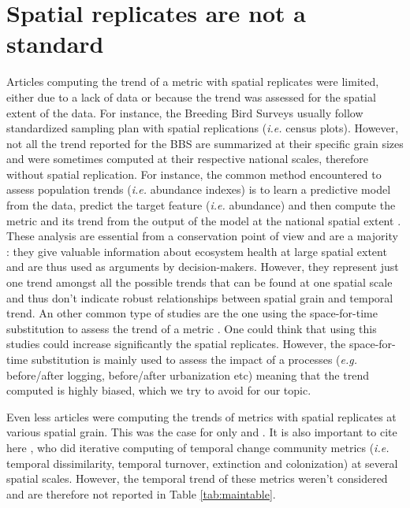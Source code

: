 \documentclass[
  12pt,
  oneside]{report}
\begin{document}
\hypertarget{spatial-replicates-are-not-a-standard}{%
\section{Spatial replicates are not a standard}\label{spatial-replicates-are-not-a-standard}}

Articles computing the trend of a metric with spatial replicates were limited, either due to a lack of data or because the trend was assessed for the spatial extent of the data. For instance, the Breeding Bird Surveys \autocites[\emph{e.g.}][]{sauer_north_2013,kamp_population_2021} usually follow standardized sampling plan with spatial replications (\emph{i.e.} census plots). However, not all the trend reported for the BBS are summarized at their specific grain sizes and were sometimes computed at their respective national scales, therefore without spatial replication. For instance, the common method encountered to assess population trends (\emph{i.e.} abundance indexes) is to learn a predictive model from the data, predict the target feature (\emph{i.e.} abundance) and then compute the metric and its trend from the output of the model at the national spatial extent \autocites[\emph{e.g.}][]{jiguet_modeling_2005,jiguet_french_2012,eglington_disentangling_2012,doxa_low-intensity_2010,sauer_first_2017}. These analysis are essential from a conservation point of view and are a majority \autocite{fraixedas_state_2020}: they give valuable information about ecosystem health at large spatial extent and are thus used as arguments by decision-makers. However, they represent just one trend amongst all the possible trends that can be found at one spatial scale and thus don't indicate robust relationships between spatial grain and temporal trend. An other common type of studies are the one using the space-for-time substitution \autocite{walker_use_2010} to assess the trend of a metric \autocite[one of the best example is][]{hill_determining_2004}. One could think that using this studies could increase significantly the spatial replicates. However, the space-for-time substitution is mainly used to assess the impact of a processes (\emph{e.g.} before/after logging, before/after urbanization etc) meaning that the trend computed is highly biased, which we try to avoid for our topic.

Even less articles were computing the trends of metrics with spatial replicates at various spatial grain. This was the case for only \textcite{chase_species_2019} and \textcite{jarzyna_taxonomic_2018}. It is also important to cite here \textcite{jarzyna_spatial_2015}, who did iterative computing of temporal change community metrics (\emph{i.e.} temporal dissimilarity, temporal turnover, extinction and colonization) at several spatial scales. However, the temporal trend of these metrics weren't considered and are therefore not reported in Table \ref{tab:maintable}.
\end{document}
